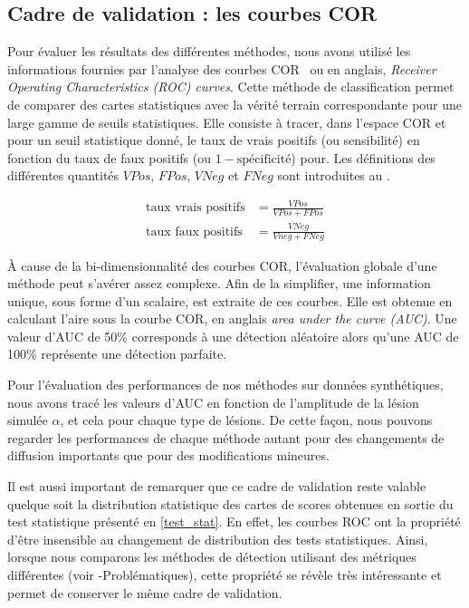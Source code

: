 \subsection{Cadre de validation : les courbes COR}
Pour évaluer les résultats des différentes méthodes, nous avons utilisé les informations fournies par l'analyse des courbes COR~\cite{Fawcett2006} 
ou en anglais, \textit{Receiver Operating Characteristics (ROC) curves}.
Cette méthode de classification permet de comparer des cartes statistiques avec la vérité terrain correspondante pour une large gamme de seuils statistiques.
Elle consiste à tracer, dans l'espace COR et pour un seuil statistique donné, 
le taux de vrais positifs (ou sensibilité) en fonction du taux de faux positifs (ou $1-\text{spécificité}$) pour.
Les définitions des différentes quantités $VPos$, $FPos$, $VNeg$ et $FNeg$ sont introduites au .

\begin{align}
    \mbox{taux vrais positifs} &= \frac{VPos}{VPos + FPos}\\
    \mbox{taux faux positifs} &= \frac{VNeg}{Vneg + FNeg}
\end{align}

À cause de la bi-dimensionnalité des courbes COR, l'évaluation globale d'une méthode peut s'avérer assez complexe.
Afin de la simplifier, une information unique, sous forme d'un scalaire, est extraite de ces courbes.
Elle est obtenue en calculant l'aire sous la courbe COR, en anglais \textit{area under the curve (AUC)}.
Une valeur d'AUC de 50\% corresponds à une détection aléatoire alors qu'une AUC de 100\% représente une détection parfaite.

Pour l'évaluation des performances de nos méthodes sur données synthétiques, 
nous avons tracé les valeurs d'AUC en fonction de l'amplitude de la lésion simulée $\alpha$, et cela pour chaque type de lésions.
De cette façon, nous pouvons regarder les performances de chaque méthode autant pour des changements de diffusion importants que pour des modifications mineures.

Il est aussi important de remarquer que ce cadre de validation reste valable quelque soit la distribution statistique 
des cartes de scores obtenues en sortie du test statistique présenté en \eqref{test_stat}.
En effet, les courbes ROC ont la propriété d'être insensible au changement de distribution des tests statistiques.
Ainsi, lorsque nous comparons les méthodes de détection utilisant des métriques différentes (voir -Problématiques), 
cette propriété se révèle très intéressante et permet de conserver le même cadre de validation.

